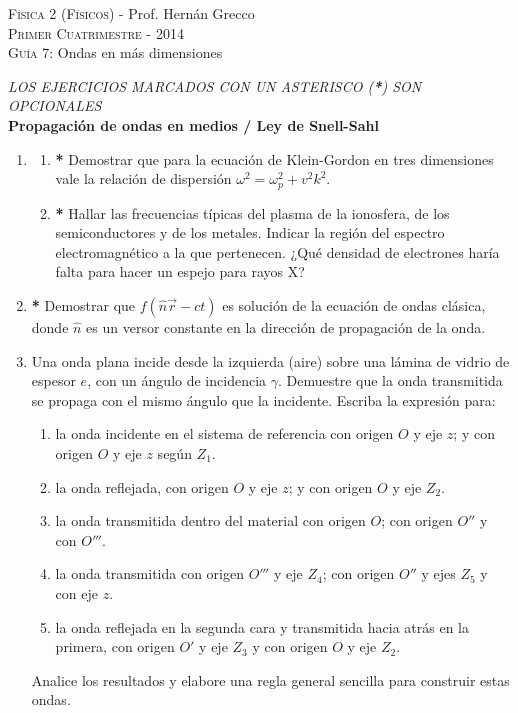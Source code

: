 \documentclass[11pt,spanish,a4paper]{article}
\begin{document}
\begin{center}
	\textsc{\large Física 2 (Físicos)} - Prof. Hernán Grecco\\
	\textsc{\large Primer Cuatrimestre - 2014}\\
	\textsc{\large Guía 7:}	Ondas en más dimensiones
\end{center}


\emph{LOS EJERCICIOS MARCADOS CON UN ASTERISCO (\textbf{*}) SON OPCIONALES}\\


\textbf{Propagación de ondas en medios / Ley de Snell-Sahl}

\begin{enumerate}
\item
\begin{enumerate}
	\item \textbf{*} Demostrar que para la ecuación de Klein-Gordon en tres dimensiones vale la relación de dispersión \(\omega^2= \omega_p^2 + v^2 k^2\).
	\item \textbf{*} Hallar las frecuencias típicas del plasma de la ionosfera, de los semiconductores y de los metales.
		Indicar la región del espectro electromagnético a la que pertenecen.
		¿Qué densidad de electrones haría falta para hacer un espejo para rayos X?
\end{enumerate}


\item \textbf{*} Demostrar que \(f(\hat{n} \vec{r} - ct)\) es solución de la ecuación de ondas clásica, donde \(\hat{n}\) es un versor constante en la dirección de propagación de la onda.


\item Una onda plana incide desde la izquierda (aire) sobre una lámina de vidrio de espesor \(e\), con un ángulo de incidencia \(\gamma\).
	Demuestre que la onda transmitida se propaga con el	mismo ángulo que la incidente.
	Escriba la expresión para:
	\begin{enumerate}
		\item la onda incidente en el sistema de referencia con origen \(O\) y eje \(z\); y con origen \(O\) y eje \(z\) según \(Z_1\).
		\item la onda reflejada, con origen \(O\) y eje \(z\); y con origen \(O\) y eje \(Z_2\).
		\item la onda transmitida dentro del material con origen \(O\); con origen \(O''\) y con \(O'''\).
		\item la onda transmitida con origen \(O'''\) y eje \(Z_4\); con origen \(O''\) y ejes \(Z_5\) y con eje \(z\).
		\item la onda reflejada en la segunda cara y transmitida hacia atrás en la primera, con origen \(O'\) y eje \(Z_3\) y con origen \(O\) y eje \(Z_2\).
	\end{enumerate}
	Analice los resultados y elabore una regla general sencilla para construir estas ondas.


\end{enumerate}
\end{document}
